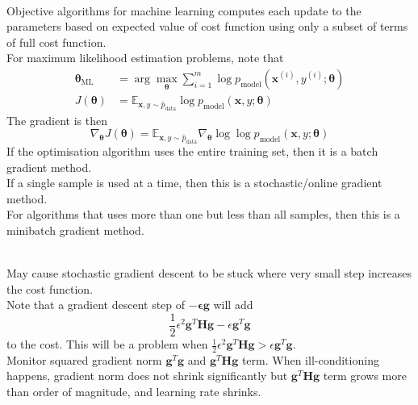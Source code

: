 \begin{remark} \\
Objective algorithms for machine learning computes each update to the parameters based on expected value of cost function using only a subset of terms of full cost function.\\
For maximum likelihood estimation problems, note that
\begin{align*}
\bm{\theta}_{\text{ML}} &= \arg \max_{\bm{\theta}} \sum\limits_{i=1}^m \log p_{\text{model}}(\bm{x}^{(i)}, y^{(i)}; \bm{\theta}) \nonumber \\
J(\bm{\theta}) &= \mathbb{E}_{\bm{x}, y \sim \hat{p}_{\text{data}}} \log p_{\text{model}} (\bm{x}, y; \bm{\theta}) \nonumber
\end{align*}
The gradient is then
\begin{equation*}
\nabla_{\bm{\theta}} J(\bm{\theta}) = \mathbb{E}_{\bm{x}, y \sim \hat{p}_{\text{data}}} \nabla_{\bm{\theta}} \log \log p_{\text{model}} (\bm{x}, y; \bm{\theta}) \nonumber
\end{equation*}
If the optimisation algorithm uses the entire training set, then it is a batch gradient method.\\
If a single sample is used at a time, then this is a stochastic/online gradient method.\\
For algorithms that uses more than one but less than all samples, then this is a minibatch gradient method.
\end{remark}

\begin{remark} \\
May cause stochastic gradient descent to be stuck where very small step increases the cost function.\\
Note that a gradient descent step of $- \bm{\epsilon} \bm{g}$ will add
\begin{equation*}
\frac{1}{2} \epsilon^2 \bm{g}^T \bm{H} \bm{g} - \epsilon \bm{g}^T \bm{g} \nonumber
\end{equation*}
to the cost. This will be a problem when $\frac{1}{2} \epsilon^2 \bm{g}^T \bm{H} \bm{g} > \epsilon \bm{g}^T \bm{g}$.\\
Monitor squared gradient norm $\bm{g}^T \bm{g}$ and $\bm{g}^T \bm{H} \bm{g}$ term. When ill-conditioning happens, gradient norm does not shrink significantly but $\bm{g}^T \bm{H} \bm{g}$ term grows more than order of magnitude, and learning rate shrinks.
\end{remark}

